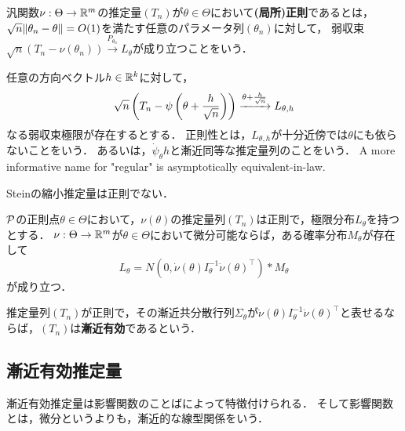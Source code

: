 \documentclass[uplatex,dvipdfmx]{jsreport}
\begin{document}
\begin{definition}
    汎関数$\nu:\Theta\to\R^m$の推定量$(T_n)$が$\theta\in\Theta$において\textbf{(局所)正則}であるとは，$\sqrt{n}\norm{\theta_n-\theta}=O(1)$を満たす任意のパラメータ列$(\theta_n)$に対して，
    弱収束$\sqrt{n}(T_n-\nu(\theta_n))\xrightarrow{P_{\theta_n}}L_\theta$が成り立つことをいう．
\end{definition}
\begin{remarks}
    任意の方向ベクトル$h\in\R^k$に対して，
    \[\sqrt{n}\paren{T_n-\psi\paren{\theta+\frac{h}{\sqrt{n}}}}\xrightarrow{\theta+\frac{h}{\sqrt{n}}}L_{\theta,h}\]
    なる弱収束極限が存在するとする．
    正則性とは，$L_{\theta,h}$が十分近傍では$\theta$にも依らないことをいう．
    あるいは，$\dot{\psi}_\theta h$と漸近同等な推定量列のことをいう．
    A more informative name for "regular" is asymptotically equivalent-in-law.\cite{Asymptotic Statistics}
\end{remarks}
\begin{example}
    Steinの縮小推定量は正則でない．
\end{example}

\begin{theorem}
    $\P$の正則点$\theta\in\Theta$において，$\nu(\theta)$の推定量列$(T_n)$は正則で，極限分布$L_\theta$を持つとする．
    $\nu:\Theta\to\R^m$が$\theta\in\Theta$において微分可能ならば，ある確率分布$M_\theta$が存在して
    \[L_\theta=N(0,\dot{\nu}(\theta)I_\theta^{-1}\dot{\nu}(\theta)^\top)*M_\theta\]
    が成り立つ．
\end{theorem}

\begin{definition}
    推定量列$(T_n)$が正則で，その漸近共分散行列$\Sigma_\theta$が$\dot{\nu}(\theta)I_\theta^{-1}\dot{\nu}(\theta)^\top$と表せるならば，$(T_n)$は\textbf{漸近有効}であるという．
\end{definition}

\subsection{漸近有効推定量}

\begin{tcolorbox}[colframe=ForestGreen, colback=ForestGreen!10!white,breakable,colbacktitle=ForestGreen!40!white,coltitle=black,fonttitle=\bfseries\sffamily,
title=]
    漸近有効推定量は影響関数のことばによって特徴付けられる．
    そして影響関数とは，微分というよりも，漸近的な線型関係をいう．
\end{tcolorbox}
\end{document}
